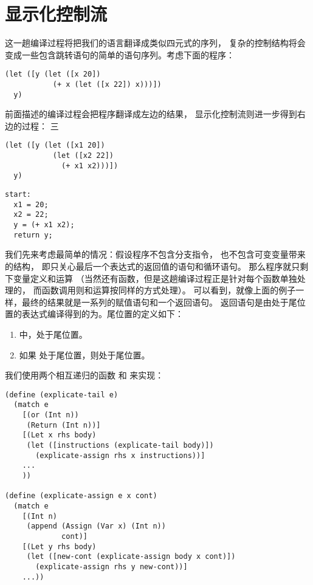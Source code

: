 
\section{显示化控制流}
\label{sec:control}

这一趟编译过程将把我们的语言翻译成类似四元式的序列，
复杂的控制结构将会变成一些包含跳转语句的简单的语句序列。考虑下面的程序：

\begin{lstlisting}
(let ([y (let ([x 20])
           (+ x (let ([x 22]) x)))])
  y)
\end{lstlisting}

前面描述的编译过程会把程序翻译成左边的结果，
显示化控制流则进一步得到右边的过程：
三
\begin{transformation}
\begin{lstlisting}
(let ([y (let ([x1 20])
           (let ([x2 22])
             (+ x1 x2)))])
  y)
\end{lstlisting}
\compilesto
\begin{lstlisting}
start:
  x1 = 20;
  x2 = 22;
  y = (+ x1 x2);
  return y;
\end{lstlisting}
\end{transformation}

我们先来考虑最简单的情况：假设程序不包含分支指令，
也不包含可变变量带来的结构，
即只关心最后一个表达式的返回值的语句和循环语句。
那么程序就只剩下变量定义和运算
（当然还有函数，但是这趟编译过程正是针对每个函数单独处理的，
而函数调用则和运算按同样的方式处理）。
可以看到，就像上面的例子一样，最终的结果就是一系列的赋值语句和一个返回语句。
返回语句是由处于尾位置的表达式编译得到的为。尾位置的定义如下：

\begin{enumerate}
\item {}中，处于尾位置。
\item 如果  处于尾位置，则处于尾位置。
\end{enumerate}

我们使用两个相互递归的函数 和 来实现：
\begin{lstlisting}
(define (explicate-tail e)
  (match e
    [(or (Int n))
     (Return (Int n))]
    [(Let x rhs body)
     (let ([instructions (explicate-tail body)])
       (explicate-assign rhs x instructions))]
    ...
    ))

(define (explicate-assign e x cont)
  (match e
    [(Int n)
     (append (Assign (Var x) (Int n))
             cont)]
    [(Let y rhs body)
     (let ([new-cont (explicate-assign body x cont)])
       (explicate-assign rhs y new-cont))]
    ...))
\end{lstlisting}

